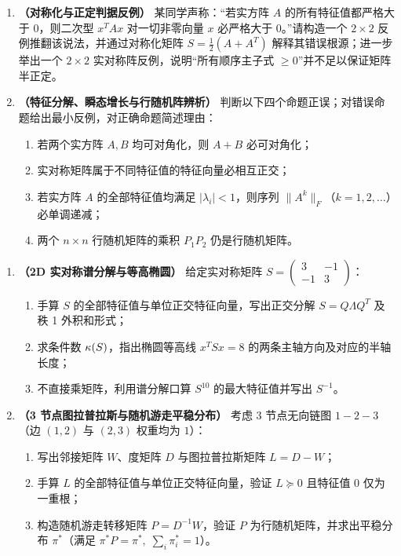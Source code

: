 \begin{enumerate}[label=\textbf{3.\arabic*}, leftmargin=2.4em]
  \item \textbf{（对称化与正定判据反例）} 某同学声称：“若实方阵 $A$ 的所有特征值都严格大于 $0$，则二次型 $x^T A x$ 对一切非零向量 $x$ 必严格大于 $0$。”请构造一个 $2\times 2$ 反例推翻该说法，并通过对称化矩阵 $S = \frac{1}{2}(A + A^T)$ 解释其错误根源；进一步举出一个 $2\times 2$ 实对称阵反例，说明“所有顺序主子式 $\ge 0$”并不足以保证矩阵半正定。

  \item \textbf{（特征分解、瞬态增长与行随机阵辨析）} 判断以下四个命题正误；对错误命题给出最小反例，对正确命题简述理由：
  \begin{enumerate}[label=(\alph*), leftmargin=1.8em]
    \item 若两个实方阵 $A, B$ 均可对角化，则 $A + B$ 必可对角化；
    \item 实对称矩阵属于不同特征值的特征向量必相互正交；
    \item 若实方阵 $A$ 的全部特征值均满足 $|\lambda_i| < 1$，则序列 $\|A^k\|_F$（$k=1,2,\dots$）必单调递减；
    \item 两个 $n\times n$ 行随机矩阵的乘积 $P_1 P_2$ 仍是行随机矩阵。
  \end{enumerate}
\end{enumerate}


\begin{enumerate}[label=\textbf{3.\arabic*}, leftmargin=2.4em, resume]
  \item \textbf{（2D 实对称谱分解与等高椭圆）} 给定实对称矩阵 $S = \begin{pmatrix} 3 & -1 \\ -1 & 3 \end{pmatrix}$：
  \begin{enumerate}[label=(\arabic*), leftmargin=1.8em]
    \item 手算 $S$ 的全部特征值与单位正交特征向量，写出正交分解 $S = Q\Lambda Q^T$ 及秩 1 外积和形式；
    \item 求条件数 $\kappa(S)$，指出椭圆等高线 $x^T S x = 8$ 的两条主轴方向及对应的半轴长度；
    \item 不直接乘矩阵，利用谱分解口算 $S^{10}$ 的最大特征值并写出 $S^{-1}$。
  \end{enumerate}

  \item \textbf{（3 节点图拉普拉斯与随机游走平稳分布）} 考虑 3 节点无向链图 $1 - 2 - 3$（边 $(1,2)$ 与 $(2,3)$ 权重均为 $1$）：
  \begin{enumerate}[label=(\arabic*), leftmargin=1.8em]
    \item 写出邻接矩阵 $W$、度矩阵 $D$ 与图拉普拉斯矩阵 $L = D - W$；
    \item 手算 $L$ 的全部特征值与单位正交特征向量，验证 $L \succeq 0$ 且特征值 $0$ 仅为一重根；
    \item 构造随机游走转移矩阵 $P = D^{-1}W$，验证 $P$ 为行随机矩阵，并求出平稳分布 $\pi^*$（满足 $\pi^* P = \pi^*,\; \sum_i \pi_i^* = 1$）。
  \end{enumerate}
\end{enumerate}

